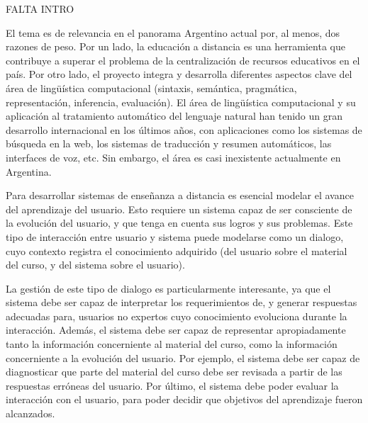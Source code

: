 
FALTA INTRO

El tema es de relevancia en el panorama Argentino actual por, al menos, dos razones de peso. Por un lado, la educaci\'on a distancia es una herramienta
que contribuye a superar el problema de la centralizaci\'on de recursos
educativos en el pa\'is. Por otro lado, el proyecto
integra y desarrolla diferentes aspectos clave del \'area de ling\"u\'istica computacional (sintaxis, sem\'antica, pragm\'atica, representaci\'on,
inferencia, evaluaci\'on). El \'area de ling\"u\'istica computacional y su
aplicaci\'on al tratamiento autom\'atico del lenguaje natural han tenido un
gran desarrollo internacional en los \'ultimos a\~nos, con aplicaciones como los sistemas de b\'usqueda en la web, los sistemas de traducci\'on y resumen autom\'aticos, las interfaces de voz, etc. Sin embargo, el \'area es casi inexistente actualmente en Argentina.

Para desarrollar sistemas de ense\~nanza a distancia es esencial modelar el avance del aprendizaje del usuario. Esto requiere un sistema capaz de ser consciente de la evoluci\'on del usuario, y que tenga en cuenta sus logros y sus problemas. Este tipo de interacci\'on entre usuario y sistema puede modelarse como un dialogo, cuyo contexto registra el conocimiento adquirido (del usuario sobre el material del curso, y del sistema sobre el usuario).

La gesti\'on de este tipo de dialogo es particularmente interesante, ya que el sistema debe ser capaz de interpretar los requerimientos de, y generar respuestas adecuadas para, usuarios no expertos cuyo conocimiento evoluciona durante la interacci\'on. Adem\'as, el sistema debe ser capaz de representar apropiadamente tanto la informaci\'on concerniente al material del curso, como la informaci\'on concerniente a la evoluci\'on del usuario. Por ejemplo, el sistema debe ser capaz de diagnosticar que parte del material del curso debe ser revisada a partir de las respuestas err\'oneas del usuario.  Por \'ultimo, el sistema debe poder evaluar la interacci\'on con el usuario, para poder decidir
que objetivos del aprendizaje fueron alcanzados.



